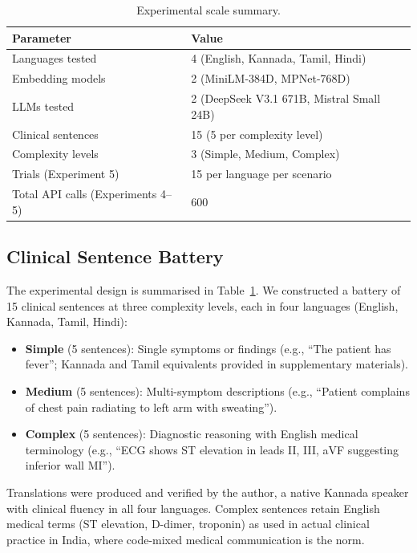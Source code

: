 \documentclass[11pt,a4paper]{article}
\begin{document}
\begin{table}[H]
\centering
\begin{tabular}{ll}
\toprule
\textbf{Parameter} & \textbf{Value} \\
\midrule
Languages tested & 4 (English, Kannada, Tamil, Hindi) \\
Embedding models & 2 (MiniLM-384D, MPNet-768D) \\
LLMs tested & 2 (DeepSeek V3.1 671B, Mistral Small 24B) \\
Clinical sentences & 15 (5 per complexity level) \\
Complexity levels & 3 (Simple, Medium, Complex) \\
Trials (Experiment 5) & 15 per language per scenario \\
Total API calls (Experiments 4--5) & 600 \\
\bottomrule
\end{tabular}
\caption{Experimental scale summary.}
\label{tab:scale}
\end{table}

\subsection{Clinical Sentence Battery}

The experimental design is summarised in Table~\ref{tab:scale}. We constructed a battery of 15 clinical sentences at three complexity levels, each in four languages (English, Kannada, Tamil, Hindi):

\begin{itemize}
    \item \textbf{Simple} (5 sentences): Single symptoms or findings (e.g., ``The patient has fever''; Kannada and Tamil equivalents provided in supplementary materials).
    \item \textbf{Medium} (5 sentences): Multi-symptom descriptions (e.g., ``Patient complains of chest pain radiating to left arm with sweating'').
    \item \textbf{Complex} (5 sentences): Diagnostic reasoning with English medical terminology (e.g., ``ECG shows ST elevation in leads II, III, aVF suggesting inferior wall MI'').
\end{itemize}

Translations were produced and verified by the author, a native Kannada speaker with clinical fluency in all four languages. Complex sentences retain English medical terms (ST elevation, D-dimer, troponin) as used in actual clinical practice in India, where code-mixed medical communication is the norm.
\end{document}
